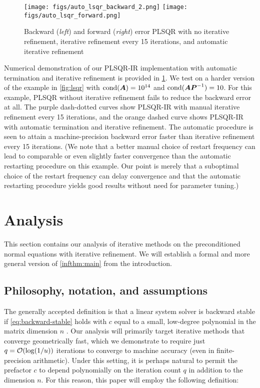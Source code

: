\documentclass[onefignum,onetabnum,pagebackref,dvipsnames]{siamart220329}
\begin{document}
\begin{figure}
    \centering
    \texttt{[image: figs/auto\_lsqr\_backward\_2.png]}
    \texttt{[image: figs/auto\_lsqr\_forward.png]}
    \caption{Backward (\emph{left}) and forward (\emph{right}) error PLSQR with no iterative refinement, iterative refinement every 15 iterations, and automatic iterative refinement}
    \label{fig:auto-lsqr-ir}
\end{figure}

Numerical demonstration of our PLSQR-IR implementation with automatic termination and iterative refinement is provided in \cref{fig:auto-lsqr-ir}.
We test on a harder version of the example in \cref{fig:lsqr} with $\operatorname{cond}(\boldsymbol{A}) = 10^{14}$ and $\operatorname{cond}(\boldsymbol{A}\boldsymbol{P}^{-1}) = 10$.
For this example, PLSQR without iterative refinement fails to reduce the backward error at all.
The purple dash-dotted curves show PLSQR-IR with manual iterative refinement every 15 iterations, and the orange dashed curve shows PLSQR-IR with automatic termination and iterative refinement.
The automatic procedure is seen to attain a machine-precision backward error faster than iterative refinement every 15 iterations.
(We note that a better manual choice of restart frequency can lead to comparable or even slightly faster convergence than the automatic restarting procedure on this example. 
Our point is merely that a suboptimal choice of the restart frequency can delay convergence and that the automatic restarting procedure yields good results without need for parameter tuning.)

\section{Analysis} \label{sec:analysis}

This section contains our analysis of iterative methods on the preconditioned normal equations with iterative refinement.
We will establish a formal and more general version of \cref{infthm:main} from the introduction.

\subsection{Philosophy, notation, and assumptions} \label{sec:notation}
The generally accepted definition is that a linear system solver is backward stable if \cref{eq:backward-stable} holds with $c$ equal to a small, low-degree polynomial in the matrix dimension $n$ \cite[sec.~7.6]{Hig02}.
Our analysis will primarily target iterative methods that converge geometrically fast, which we demonstrate to require just $q = \mathcal{O}(\log(1/u))$ iterations to converge to machine accuracy (even in finite-precision arithmetic). 
Under this setting, it is perhaps natural to permit the prefactor $c$ to depend polynomially on the iteration count $q$ in addition to the dimension $n$.
For this reason, this paper will employ the following definition:
\end{document}
